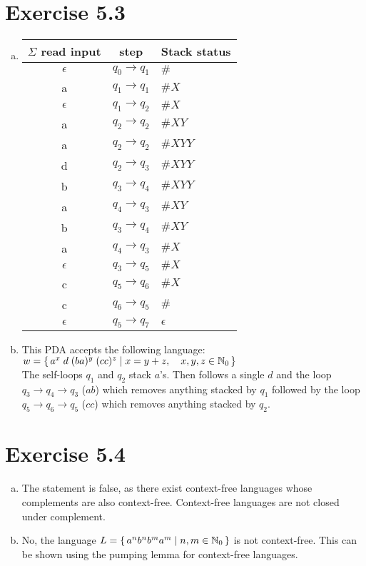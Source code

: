 \documentclass{article} %
\newcommand{\homeworkNumber}{5}
\begin{document}
\section*{Exercise \homeworkNumber.3}
\begin{enumerate}[(a)]
	\item
	\renewcommand{\arraystretch}{1.25}
	\begin{tabular}{ c | c | l }
	$\Sigma$ read input & step & Stack status\\
	\hline
	$\epsilon$ & $q_0 \to q_1$ & $\#$\\
	a & $q_1 \to q_1$ & $\#X$\\
	$\epsilon$ & $q_1 \to q_2$ & $\#X$\\
	a & $q_2 \to q_2$ & $\#XY$\\
	a & $q_2 \to q_2$ & $\#XYY$\\
	d & $q_2 \to q_3$ & $\#XYY$\\
	b & $q_3 \to q_4$ & $\#XYY$\\
	a & $q_4 \to q_3$ & $\#XY$\\
	b & $q_3 \to q_4$ & $\#XY$\\
	a & $q_4 \to q_3$ & $\#X$\\
	$\epsilon$ & $q_3 \to q_5$ & $\#X$\\
	c & $q_5 \to q_6$ & $\#X$\\
	c & $q_6 \to q_5$ & $\#$\\
	$\epsilon$ & $q_5 \to q_7$ & $\epsilon$\\
	\end{tabular}
	
	\item
	This PDA accepts the following language: 
	$w = \set{a^x \; d \; (ba)^y \; (cc)^z \mid x = y+z,\quad x,y,z \in \mathbb{N}_0}$\\
	The self-loops $q_1$ and $q_2$ stack $a$'s. Then follows a single $d$ and the loop $q_3 \to q_4 \to
	q_3$ ($ab$) which removes anything stacked by $q_1$ followed by the loop $q_5 \to q_6 \to q_5$
	($cc$) which removes anything stacked by $q_2$.
\end{enumerate}


\section*{Exercise \homeworkNumber.4}
\begin{enumerate}[(a)]
\item
The statement is false, as there exist context-free languages whose complements are also context-free. Context-free languages are not closed under complement.
\item
No, the language $L = \set{a^n b^n b^m a^m \mid n, m \in \mathbb{N}_0}$ is not context-free. This can be shown using the pumping lemma for context-free languages.
\end{enumerate}
\end{document}

